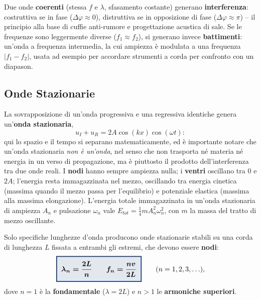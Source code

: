 \documentclass[a4paper,11pt]{article}
\newcommand{\keyeq}[1]{{\setlength{\fboxsep}{6pt}\setlength{\fboxrule}{1.3pt}\fcolorbox{chapblue}{chapblue!12}{\boldmath$\displaystyle #1$}}}
\begin{document}
Due onde \textbf{coerenti} (stessa $f$ e $\lambda$, sfasamento costante) generano \textbf{interferenza}: costruttiva se in fase ($\Delta\varphi\approx0$), distruttiva se in opposizione di fase ($\Delta\varphi\approx\pi$) -- il principio alla base di cuffie anti-rumore e progettazione acustica di sale. Se le frequenze sono leggermente diverse ($f_1\approx f_2$), si generano invece \textbf{battimenti}: un'onda a frequenza intermedia, la cui ampiezza è modulata a una frequenza $|f_1-f_2|$, usata ad esempio per accordare strumenti a corda per confronto con un diapason.

\subsection{Onde Stazionarie}

La sovrapposizione di un'onda progressiva e una regressiva identiche genera un'\textbf{onda stazionaria},
\[
u_I+u_R = 2A\cos(kx)\cos(\omega t):
\]
qui lo spazio e il tempo si separano matematicamente, ed è importante notare che un'onda stazionaria \emph{non è un'onda}, nel senso che non trasporta né materia né energia in un verso di propagazione, ma è piuttosto il prodotto dell'interferenza tra due onde reali. I \textbf{nodi} hanno sempre ampiezza nulla; i \textbf{ventri} oscillano tra $0$ e $2A$; l'energia resta immagazzinata nel mezzo, oscillando tra energia cinetica (massima quando il mezzo passa per l'equilibrio) e potenziale elastica (massima alla massima elongazione). L'energia totale immagazzinata in un'onda stazionaria di ampiezza $A_n$ e pulsazione $\omega_n$ vale $E_{tot}=\frac14mA_n^2\omega_n^2$, con $m$ la massa del tratto di mezzo oscillante.

Solo specifiche lunghezze d'onda producono onde stazionarie stabili su una corda di lunghezza $L$ fissata a entrambi gli estremi, che devono essere \textbf{nodi}:
\[
\keyeq{\lambda_n = \frac{2L}{n} \qquad f_n = \frac{nv}{2L}} \qquad (n=1,2,3,\ldots),
\]
dove $n=1$ è la \textbf{fondamentale} ($\lambda=2L$) e $n>1$ le \textbf{armoniche superiori}.

\begin{center}
\end{center}
\end{document}
